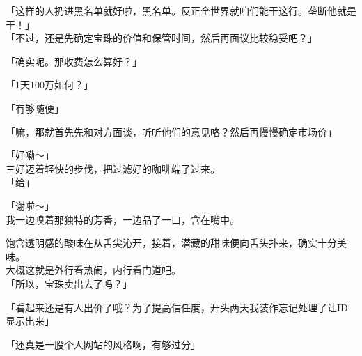 「这样的人扔进黑名单就好啦，黑名单。反正全世界就咱们能干这行。垄断他就是干！」\\

「不过，还是先确定宝珠的价值和保管时间，然后再面议比较稳妥吧？」

「确实呢。那收费怎么算好？」

「1天100万如何？」

「有够随便」

「嘛，那就首先先和对方面谈，听听他们的意见咯？然后再慢慢确定市场价」

「好嘞～」\\

三好迈着轻快的步伐，把过滤好的咖啡端了过来。\\

「给」

「谢啦～」\\

我一边嗅着那独特的芳香，一边品了一口，含在嘴中。

饱含透明感的酸味在从舌尖沁开，接着，潜藏的甜味便向舌头扑来，确实十分美味。\\

大概这就是外行看热闹，内行看门道吧。\\

「所以，宝珠卖出去了吗？」

「看起来还是有人出价了哦？为了提高信任度，开头两天我装作忘记处理了让ID显示出来」

「还真是一股个人网站的风格啊，有够过分」

